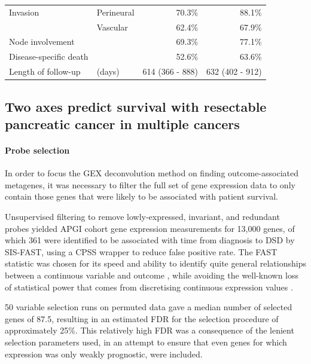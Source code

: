 \documentclass[dissertation.tex]{subfiles}
\begin{document}
\begin{table}[h]
\begin{tabular}{@{}llrr@{}}
Invasion                   & Perineural               & 70.3\%                   & 88.1\%                                                 \\
                           & Vascular                 & 62.4\%                   & 67.9\%                                                 \\
Node involvement           &                          & 69.3\%                   & 77.1\%                                                 \\
Disease-specific death     &                          & 52.6\%                   & 63.6\%                                                 \\
Length of follow-up & (days)                         & 614 (366 - 888)          & 632 (402 - 912)                                       
\end{tabular}
\end{table}

\subsection{Two axes predict survival with resectable pancreatic cancer in multiple cancers}
\paragraph{Probe selection}
In order to focus the \gls{GEX} deconvolution method on finding outcome-associated metagenes, it was necessary to filter the full set of gene expression data to only contain those genes that were likely to be associated with patient survival.

Unsupervised filtering to remove lowly-expressed, invariant, and redundant probes yielded \gls{APGI} cohort gene expression measurements for 13,000 genes, of which 361 were identified to be associated with time from diagnosis to \gls{DSD} by \gls{SIS}-\gls{FAST}, using a \gls{CPSS} wrapper to reduce false positive rate.  The \gls{FAST} statistic was chosen for its speed and ability to identify quite general relationships between a continuous variable and outcome \cite{Gorst-Rasmussen2013}, while avoiding the well-known loss of statistical power that comes from discretising continuous expression values \cite{Royston2006}.

50 variable selection runs on permuted data gave a median number of selected genes of 87.5, resulting in an estimated \gls{FDR} for the selection procedure of approximately 25\%.  This relatively high \gls{FDR} was a consequence of the lenient selection parameters used, in an attempt to ensure that even genes for which expression was only weakly prognostic, were included.
\end{document}
